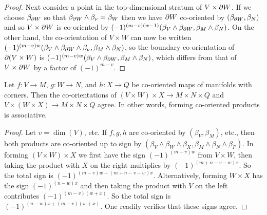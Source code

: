 \begin{proof}
	Next consider a point in the top-dimensional stratum of $V \times \partial W$.
	If we choose $\beta_{\partial W}$ so that $\beta_{\partial W} \wedge \beta_\nu = \beta_W$ then we have $\partial W$ co-oriented by $(\beta_{\partial W},\beta_N)$ and so $V \times \partial W$ is co-oriented by $(-1)^{(m-v)(w-1)}(\beta_{V} \wedge \beta_{\partial W},\beta_M \wedge \beta_N)$.
	On the other hand, the co-orientation of $V \times W$ can now be written $(-1)^{(m-v)w}(\beta_{V} \wedge \beta_{\partial W} \wedge \beta_\nu,\beta_M \wedge \beta_N)$, so the boundary co-orientation of $\partial(V \times W)$ is $(-1)^{(m-v)w}(\beta_{V} \wedge \beta_{\partial W},\beta_{M} \wedge \beta_N)$, which differs from that of $V \times \partial W$ by a factor of $(-1)^{m-v}$.
\end{proof}

\begin{proposition}\label{P: exterior associativity}
	Let $f \colon V \to M$, $g \colon W \to N$, and $h \colon X \to Q$ be co-oriented maps of manifolds with corners.
	Then the co-orientations of $(V \times W) \times X \to M \times N \times Q$ and $V \times (W \times X) \to M \times N \times Q$ agree.
	In other words, forming co-oriented products is associative.
\end{proposition}

\begin{proof}
	Let $v = \dim(V)$, etc.
	If $f,g,h$ are co-oriented by $(\beta_V,\beta_M)$, etc., then both products are co-oriented up to sign by $(\beta_V \wedge \beta_W \wedge \beta_X,\beta_M \wedge \beta_N \wedge \beta_P)$.
	In forming $(V \times W) \times X$ we first have the sign $(-1)^{(m-v)w}$ from $V \times W$, then taking the product with $X$ on the right multiplies by $(-1)^{(m+n-v-w)x}$.
	So the total sign is $(-1)^{(m-v)w+(m+n-v-w)x}$.
	Alternatively, forming $W \times X$ has the sign $(-1)^{(n-w)x}$ and then taking the product with $V$ on the left contributes $(-1)^{(m-v)(w+x)}$.
	So the total sign is $(-1)^{(n-w)x+(m-v)(w+x)}$.
	One readily verifies that these signs agree.
\end{proof}

\begin{comment}
	Dev and Anibal, please check the following arguments carefully as I'm not 100\% confident in it.
	It gives the ``right'' answer but I'm a little uncomfortable divorcing the order of the orientation terms from the order of the manifold terms.
	Of course this happens all the time - even if we think of $\R^2$ as $\R_x \oplus \R_y$ we can still think about the two-form $y \wedge x$, but I'm still a little nervous about maybe having missed a sign somewhere.
	I'm also a little nervous about my trick of taking $a$ and $b$ to be even so that they won't contribute, but the earlier work says that this should be allowable.
	Presumably if I didn't do this there would be a bunch of extra signs that miraculous cancel out, but I'm not so excited about trying that out in detail to see.
\end{comment}


